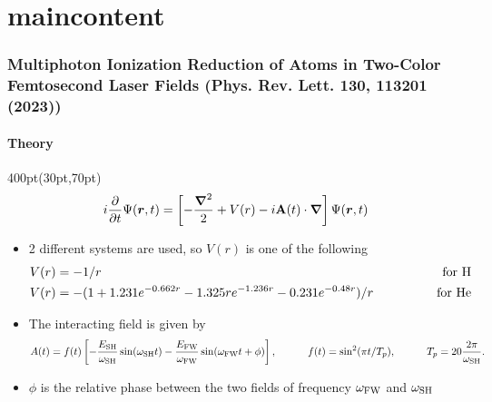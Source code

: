 
\section{maincontent}

\begin{frame}
\frametitle{Multiphoton Ionization Reduction of Atoms in Two-Color 
Femtosecond Laser Fields \small (Phys. Rev. Lett. \textbf{130}, 113201 (2023))}
\framesubtitle{Theory}


\footnotesize
\begin{textblock*}{400pt}(30pt,70pt)
\begin{equation}
i\frac{\partial}{\partial t}\Psi(\boldsymbol{r},t) = 
\left[ -\frac{\boldsymbol{\nabla}^2}{2} + V(r) - i\boldsymbol{\rm A}(t)\cdot\boldsymbol{\nabla}\right]\Psi(\boldsymbol{r},t)
\end{equation}
\begin{itemize}
\item 2 different systems are used, so $V(r)$ is one of the following
\begin{align}
V(r) & = -1/r\hspace{40pt}&\ \mbox{for $\rm H$} \\
V(r) & = -(1+1.231e^{-0.662r}-1.325re^{-1.236r}-0.231e^{-0.48r})/r
\hspace{40pt}&\mbox{for $\rm He$}
\end{align}
\item The interacting field is given by
\begin{align}
A(t) = f(t)\left[ -\frac{E_{\rm SH}}{\omega_{\rm SH}}\sin(\omega_{\rm SH} t)
     -\frac{E_{\rm FW}}{\omega_{\rm FW}}\sin(\omega_{\rm FW} t+\phi) \right],
\hspace{30pt}f(t)=\sin^2(\pi t/T_p),
\hspace{30pt}T_p=20\frac{2\pi}{\omega_{\rm SH}}.
\end{align}
\item $\phi$ is the relative phase between the two fields of frequency 
$\omega_{\rm FW}$ and $\omega_{\rm SH}$ 
\end{itemize}
\end{textblock*}
 
\end{frame}


